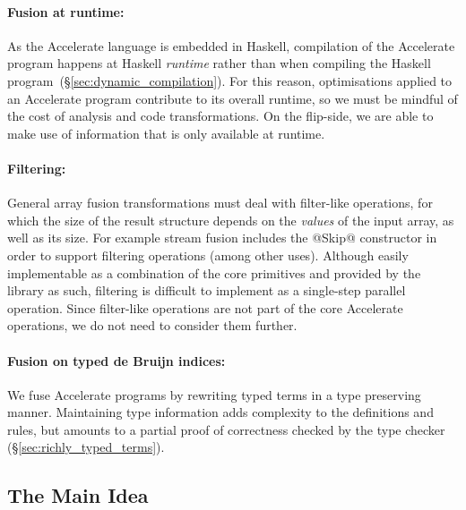 \paragraph{Fusion at runtime:} As the Accelerate language is embedded in
Haskell, compilation of the Accelerate program happens at Haskell \emph{runtime}
rather than when compiling the Haskell
program~(\S\ref{sec:dynamic_compilation}). For this reason, optimisations
applied to an Accelerate program contribute to its overall runtime, so we must
be mindful of the cost of analysis and code transformations. On the flip-side,
we are able to make use of information that is only available at runtime.

\paragraph{Filtering:} General array fusion transformations must deal with
filter-like operations, for which the size of the result structure depends on
the \emph{values} of the input array, as well as its size. For example
stream fusion includes the @Skip@ constructor in
order to support filtering operations (among other uses). Although easily
implementable as a combination of the core primitives and provided by the
library as such, filtering is difficult to implement as a single-step parallel
operation. Since filter-like operations are not part of the core Accelerate
operations, we do not need to consider them further.

%

\paragraph{Fusion on typed de Bruijn indices:} We fuse Accelerate programs by
rewriting typed  terms in a type preserving manner.
Maintaining type information adds complexity to the definitions and rules, but
amounts to a partial proof of correctness checked by the type checker
(\S\ref{sec:richly_typed_terms}).


\subsection{The Main Idea}
\label{sec:the_main_idea}

